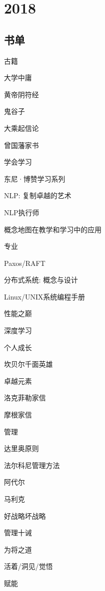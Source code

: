 \chapter{2018}

\section{书单}

古籍
\begin{enumbox} 
\item 大学中庸
\item 黄帝阴符经
\item 鬼谷子
\item 大乘起信论
\item 曾国藩家书
\end{enumbox} 

学会学习
\begin{enumbox}
\item 东尼·博赞学习系列
\item NLP: 复制卓越的艺术
\item NLP执行师
\item 概念地图在教学和学习中的应用
\end{enumbox}

专业
\begin{enumbox}
\item Paxos/RAFT
\item 分布式系统: 概念与设计
\item Linux/UNIX系统编程手册
\item 性能之巅
\item 深度学习
\end{enumbox}

个人成长
\begin{enumbox}
\item 坎贝尔千面英雄
\item 卓越元素
\item 洛克菲勒家信
\item 摩根家信
\end{enumbox} 

管理
\begin{enumbox} 
\item 达里奥原则
\item 法尔科尼管理方法
\item 阿代尔
\item 马利克
\item 好战略坏战略
\item 管理十诫
\item 为将之道
\item 活着/洞见/觉悟
\item 赋能
\end{enumbox} 

